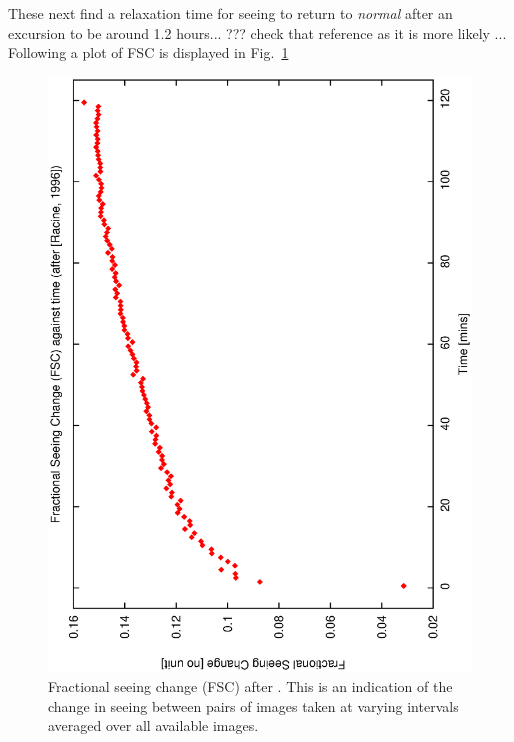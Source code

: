 {{These next find a relaxation time for seeing to return to \emph{normal} after an excursion to be around 1.2 hours...\cite{munoz98homogeneity} ??? check that reference as it is more likely ..\cite{vernin98temporal}. Following \cite{racine96temporal} a plot of FSC is displayed in Fig.~\ref{fig:fsc}

\begin{figure}[htbp]
\begin{center}
    \includegraphics[scale=0.4, angle=-90]{figures/ecs/fsc.eps}
\end{center} 
\caption[Fractional seeing change (FSC) after \cite{racine96temporal}.]
{Fractional seeing change (FSC) after \cite{racine96temporal}. This is an indication of the change in seeing between pairs of images taken at varying intervals averaged over all available images.}
\label{fig:fsc}
\end{figure}



}}
